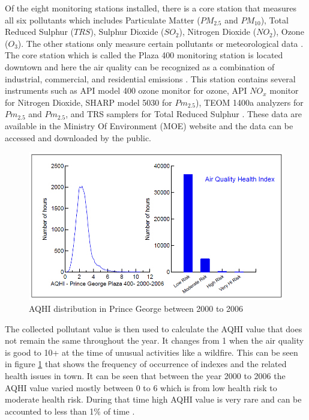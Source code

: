  Of the eight monitoring stations installed, there is a core station that measures all six pollutants which includes Particulate Matter ($PM_{2.5}$ and $PM_{10}$), Total Reduced Sulphur ($TRS$), Sulphur Dioxide ($SO_{2}$), Nitrogen Dioxide ($NO_2$), Ozone (${O_3}$). The other stations only measure certain pollutants or meteorological data \cite{Environment2016}. The core station which is called the Plaza 400 monitoring station is located downtown and here the air quality can be recognized as a combination of industrial, commercial, and residential emissions \cite{Authority2011}. This station contains several instruments such as  API model 400 ozone monitor for ozone, API $NO_{x}$ monitor for Nitrogen Dioxide, SHARP model 5030 for $Pm_{2.5}$), TEOM 1400a analyzers for $Pm_{2.5}$ and $Pm_{2.5}$, and TRS samplers for Total Reduced Sulphur \cite{Environment2016}\cite{Authority2011}. These data are available in the Ministry Of Environment (MOE) \cite{ MOE2020} website and the data can be accessed and downloaded by the public.

 
  
 \begin{figure}[h!]
  \begin{center}
  \includegraphics[scale=0.80]{./images/figure39.png}
  \end{center}
 
  \caption{AQHI distribution in Prince George between 2000 to 2006\cite{hasselback2010air}}
  
  \label{distribution}
\end{figure}
 The collected pollutant value is then used to calculate the AQHI value that does not remain the same throughout the year. It changes from 1 when the air quality is good to 10+ at the time of unusual activities like a wildfire. This can be seen in figure \ref{distribution} that shows the frequency of occurrence of indexes and the related health issues in town. It can be seen that between the year 2000 to 2006 the AQHI value varied mostly between 0 to 6 which is from low health risk to moderate health risk. During that time high AQHI value is very rare and can be accounted to less than 1\% of time \cite{hasselback2010air}.
 


